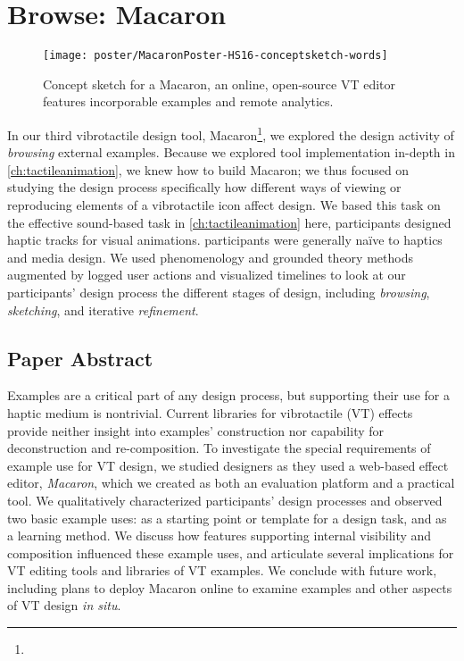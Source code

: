 


\chapter{Browse: Macaron}
\label{ch:macaron}

\begin{figure}[htbp]
\begin{center}
\texttt{[image: poster/MacaronPoster-HS16-conceptsketch-words]}
\caption{Concept sketch for a Macaron, an online, open-source VT editor features incorporable examples and remote analytics.}
\label{hapticexamples:designgallerysketch}
\end{center}
\end{figure}

\noindent
{} 
In our third vibrotactile design tool, Macaron\footnote{}, we explored the design activity of \emph{browsing} external examples.
Because we explored \haxd tool implementation in-depth in \autoref{ch:tactileanimation}, we knew how to build Macaron; we thus focused on studying the design process specifically  how different ways of viewing or reproducing elements of a vibrotactile icon affect design.
We based this task on the effective sound-based task in \autoref{ch:tactileanimation}\osE{:} here, participants designed haptic tracks for visual animations.
 participants were generally na\"ive to haptics and media design.
We used phenomenology and grounded theory methods augmented by logged user actions and visualized timelines to look at our participants' design process
the different stages of design, including \emph{browsing}, \emph{sketching}, and iterative \emph{refinement}.


\section{Paper Abstract}
Examples are a critical part of any design process,
but supporting their use for a haptic medium is nontrivial.
Current  libraries for vibrotactile (VT) effects provide neither insight into examples' construction nor  capability for 
deconstruction and re-composition.
To investigate the special requirements of example use for VT design, we studied designers as they used a web-based effect editor, \emph{Macaron}, which we created as both an evaluation platform and a practical tool. 
We qualitatively characterized participants' design processes and observed two basic example uses: as a starting point or template for a design task, and as a learning method.
We discuss how features supporting internal visibility and composition influenced these example uses, and articulate several implications for VT editing tools and libraries of VT examples.
We conclude with future work, including plans to deploy Macaron online to examine examples and other aspects of VT design \emph{in situ}.



